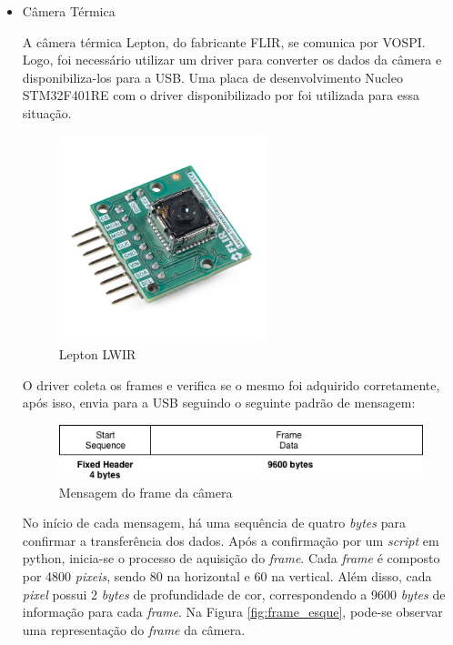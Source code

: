 \begin{itemize}
\item Câmera Térmica

A câmera térmica Lepton, do fabricante FLIR, se comunica por VOSPI. Logo, foi necessário utilizar um driver para converter os dados da câmera e disponibiliza-los para a USB. Uma placa de desenvolvimento Nucleo STM32F401RE com o driver disponibilizado por  foi utilizada para essa situação.

\begin{figure}[!ht]
	\centering
	\includegraphics[width=6cm]{Figures/lepton_flir.jpg}
	\caption{Lepton LWIR}
	\label{fig:lepton}
\end{figure}

O driver coleta os frames e verifica se o mesmo foi adquirido corretamente, após isso, envia para a USB seguindo o seguinte padrão de mensagem:

\begin{figure}[!ht]
	\centering
	\includegraphics[width=14cm]{Figures/frame_msg.png}
	\caption{Mensagem do frame da câmera}
	\label{fig:framemsg}
\end{figure}

No início de cada mensagem, há uma sequência de quatro \textit{bytes} para confirmar a transferência dos dados. Após a confirmação por um \textit{script} em python, inicia-se o processo de aquisição do \textit{frame}. Cada \textit{frame} é composto por 4800 \textit{pixeis}, sendo 80 na horizontal e 60 na vertical. Além disso, cada \textit{pixel} possui 2 \textit{bytes} de profundidade de cor, correspondendo a 9600 \textit{bytes} de informação para cada \textit{frame}. Na Figura \ref{fig:frame_esque}, pode-se observar uma representação do \textit{frame} da câmera.


\end{itemize}
